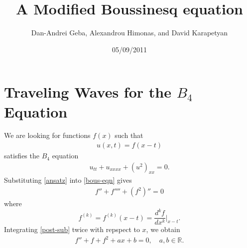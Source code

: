 \documentclass[12pt,reqno]{amsart}
\numberwithin{equation}{section}  %
\newcommand{\rr}{\mathbb{R}}
\begin{document}
\title{A Modified Boussinesq equation}
\author{Dan-Andrei Geba, Alexandrou Himonas, and David Karapetyan}
\address{Department of Mathematics, University of Rochester, Rochester, NY 14627}
\address{Department of Mathematics, University of Notre Dame, Notre Dame, IN 46556}
\address{Department of Mathematics, University of Notre Dame, Notre Dame, IN 46556}
\date{05/09/2011}
%
%
\maketitle
%
%
%
%
%
%
%
%
\section{Traveling Waves for the $B_{4}$ Equation} 
\label{sec:trav-wave}
We are looking for functions $f(x)$ such that
%
%
\begin{equation}
  \label{ansatz}
\begin{split}
u(x,t) = f(x-t)
\end{split}
\end{equation}
%
%
satisfies the $B_{4}$ equation
%
%
\begin{equation}
  \label{bous-eqn}
\begin{split}
  u_{tt} + u_{xxxx} + (u^{2})_{xx} = 0.
\end{split}
\end{equation}
%
%
Substituting \eqref{ansatz} into \eqref{bous-eqn} gives
%
%
\begin{equation}
\begin{split}
 f'' + f'''' + (f^{2})'' = 0
\end{split}
\label{post-sub}
\end{equation}
%
%
where $$f^{(k)} = f^{(k)}(x-t) = \frac{d^{k}f}{dx^{k}} \Big |_{x-t}.$$ 
Integrating \eqref{post-sub} twice with repspect to $x$, we obtain
%
%
\begin{equation}
  \label{pre-const-elim}
\begin{split}
  f'' + f + f^{2} + ax +b = 0, \quad a,b \in \rr.
\end{split}
\end{equation}
%
%
\end{document}
